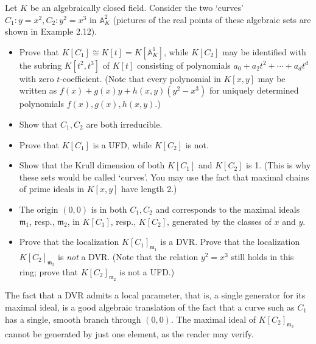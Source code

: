 \documentclass[../../master.tex]{subfiles}
\begin{document}
\begin{problem}
    Let $K$ be an algebraically closed field.
    Consider the two `curves' $C_1 : y = x^2, C_2 : y^2 = x^3$ in $\mathbb{A}^2_K$ (pictures of the real points of these algebraic sets are shown in Example 2.12).
    \begin{itemize}
        \item Prove that $K[C_1] \cong K[t] = K[\mathbb{A}^{1}_K]$, while $K[C_2]$ may be identified with the subring $K[t^2, t^3]$ of $K[t]$ consisting of polynomials $a_0 + a_2 t^2 + \cdots + a_d t^{d}$ with zero $t$-coefficient.
            (Note that every polynomial in $K[x, y]$ may be written as $f(x) + g(x)y + h(x, y) (y^2 - x^3)$ for uniquely determined polynomials $f(x), g(x), h(x, y)$.)
        \item Show that $C_1, C_2$ are both irreducible.
        \item Prove that $K[C_1]$ is a UFD, while $K[C_2]$ is not.
        \item Show that the Krull dimension of both $K[C_1]$ and $K[C_2]$ is 1.
            (This is why these sets would be called `curves'.
            You may use the fact that maximal chains of prime ideals in $K[x, y]$ have length 2.)
        \item The origin $(0, 0)$ is in both $C_1, C_2$ and corresponds to the maximal ideals $\mathfrak{m}_1$, resp., $\mathfrak{m}_2$, in $K[C_1]$, resp., $K[C_2]$, generated by the classes of $x$ and $y$.
        \item Prove that the localization $K[C_1]_{\mathfrak{m}_1}$ is a DVR.
            Prove that the localization $K[C_2]_{\mathfrak{m}_2}$ is \textit{not} a DVR.
            (Note that the relation $y^2 = x^3$ still holds in this ring;
            prove that $K[C_2]_{\mathfrak{m}_2}$ is not a UFD.)
    \end{itemize}
    The fact that a DVR admits a local parameter, that is, a single generator for its maximal ideal, is a good algebraic translation of the fact that a curve such as $C_1$ has a single, smooth branch through $(0, 0)$.
    The maximal ideal of $K[C_2]_{\mathfrak{m}_2}$ cannot be generated by just one element, as the reader may verify.
\end{problem}
\end{document}
